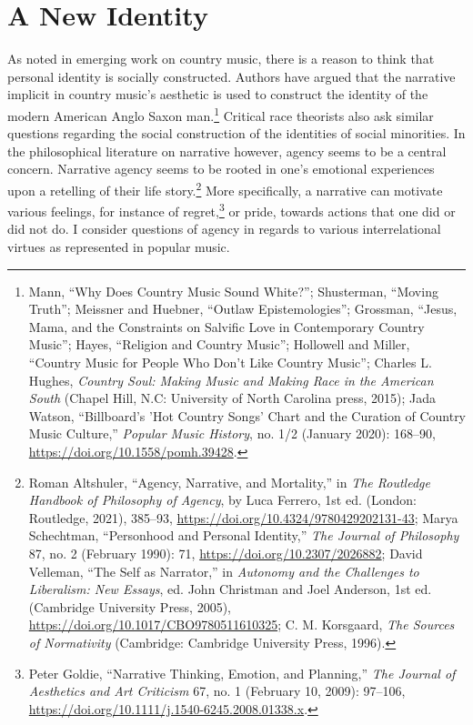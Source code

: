 \documentclass[phdthesis,12pt,final]{wuthesis}
\theoremstyle{definition}
\theoremstyle{definition}
\theoremstyle{definition}
\theoremstyle{definition}
\theoremstyle{remark}
\begin{document}
\chapter{A New Identity}\label{a-new-identity}

As noted in emerging work on country music, there is a reason to think that personal identity is socially constructed. Authors have argued that the narrative implicit in country music's aesthetic is used to construct the identity of the modern American Anglo Saxon man.\footnote{Mann, {``Why Does Country Music Sound White?''}; Shusterman, {``Moving {Truth}''}; Meissner and Huebner, {``Outlaw Epistemologies''}; Grossman, {``Jesus, {Mama}, and the {Constraints} on {Salvific Love} in {Contemporary Country Music}''}; Hayes, {``Religion and {Country Music}''}; Hollowell and Miller, {``Country {Music} for {People Who Don}'t {Like Country Music}''}; Charles L. Hughes, \emph{Country Soul: Making Music and Making Race in the {American South}} (Chapel Hill, N.C: University of North Carolina press, 2015); Jada Watson, {``Billboard's '{Hot Country Songs}' Chart and the Curation of Country Music Culture,''} \emph{Popular Music History}, no. 1/2 (January 2020): 168--90, \url{https://doi.org/10.1558/pomh.39428}.} Critical race theorists also ask similar questions regarding the social construction of the identities of social minorities. In the philosophical literature on narrative however, agency seems to be a central concern. Narrative agency seems to be rooted in one's emotional experiences upon a retelling of their life story.\footnote{Roman Altshuler, {``Agency, Narrative, and Mortality,''} in \emph{The {Routledge Handbook} of {Philosophy} of {Agency}}, by Luca Ferrero, 1st ed. (London: Routledge, 2021), 385--93, \url{https://doi.org/10.4324/9780429202131-43}; Marya Schechtman, {``Personhood and {Personal Identity},''} \emph{The Journal of Philosophy} 87, no. 2 (February 1990): 71, \url{https://doi.org/10.2307/2026882}; David Velleman, {``The {Self} as {Narrator},''} in \emph{Autonomy and the {Challenges} to {Liberalism}: {New Essays}}, ed. John Christman and Joel Anderson, 1st ed. (Cambridge University Press, 2005), \url{https://doi.org/10.1017/CBO9780511610325}; C. M. Korsgaard, \emph{The Sources of Normativity} (Cambridge: Cambridge University Press, 1996).} More specifically, a narrative can motivate various feelings, for instance of regret,\footnote{Peter Goldie, {``Narrative {Thinking}, {Emotion}, and {Planning},''} \emph{The Journal of Aesthetics and Art Criticism} 67, no. 1 (February 10, 2009): 97--106, \url{https://doi.org/10.1111/j.1540-6245.2008.01338.x}.} or pride, towards actions that one did or did not do. I consider questions of agency in regards to various interrelational virtues as represented in popular music.
\end{document}
